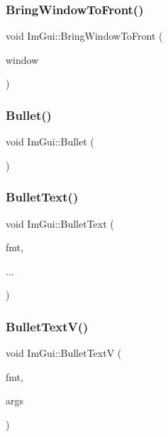 \subsubsection{\texorpdfstring{Bring\+Window\+To\+Front()}{BringWindowToFront()}}
{\footnotesize\ttfamily void Im\+Gui\+::\+Bring\+Window\+To\+Front (\begin{DoxyParamCaption}\item[{\hyperlink{struct_im_gui_window}{Im\+Gui\+Window} $\ast$}]{window }\end{DoxyParamCaption})}

\hypertarget{namespace_im_gui_ae2d22212681556d2c2398dfd152f3121}{}\label{namespace_im_gui_ae2d22212681556d2c2398dfd152f3121} 
\subsubsection{\texorpdfstring{Bullet()}{Bullet()}}
{\footnotesize\ttfamily void Im\+Gui\+::\+Bullet (\begin{DoxyParamCaption}{ }\end{DoxyParamCaption})}

\hypertarget{namespace_im_gui_af8d34d563b17c683943a0fa7bf5807bc}{}\label{namespace_im_gui_af8d34d563b17c683943a0fa7bf5807bc} 
\subsubsection{\texorpdfstring{Bullet\+Text()}{BulletText()}}
{\footnotesize\ttfamily void Im\+Gui\+::\+Bullet\+Text (\begin{DoxyParamCaption}\item[{const char $\ast$}]{fmt,  }\item[{}]{... }\end{DoxyParamCaption})}

\hypertarget{namespace_im_gui_af8f4b5e96c745e205974857f9a584583}{}\label{namespace_im_gui_af8f4b5e96c745e205974857f9a584583} 
\subsubsection{\texorpdfstring{Bullet\+Text\+V()}{BulletTextV()}}
{\footnotesize\ttfamily void Im\+Gui\+::\+Bullet\+TextV (\begin{DoxyParamCaption}\item[{const char $\ast$}]{fmt,  }\item[{va\+\_\+list}]{args }\end{DoxyParamCaption})}

